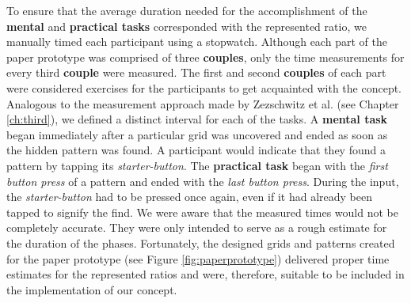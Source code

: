 To ensure that the average duration needed for the accomplishment of the \textbf{mental} and \textbf{practical tasks} corresponded with the represented ratio, we manually timed each participant using a stopwatch. Although each part of the paper prototype was comprised of three \textbf{couples}, only the time measurements for every third \textbf{couple} were measured. The first and second \textbf{couples} of each part were considered exercises for the participants to get acquainted with the concept. \\
Analogous to the measurement approach made by Zezschwitz et al. \cite{Zezschwitz} (see Chapter \ref{ch:third}), we defined a distinct interval for each of the tasks. A \textbf{mental task} began immediately after a particular grid was uncovered and ended as soon as the hidden pattern was found. A participant would indicate that they found a pattern by tapping its \textit{starter-button}. The \textbf{practical task} began with the \textit{first button press} of a pattern and ended with the \textit{last button press}. During the input, the \textit{starter-button} had to be pressed once again, even if it had already been tapped to signify the find. We were aware that the measured times would not be completely accurate. They were only intended to serve as a rough estimate for the duration of the phases. Fortunately, the designed grids and patterns created for the paper prototype (see Figure \ref{fig:paperprototype}) delivered proper time estimates for the represented ratios and were, therefore, suitable to be included in the implementation of our concept.\\

